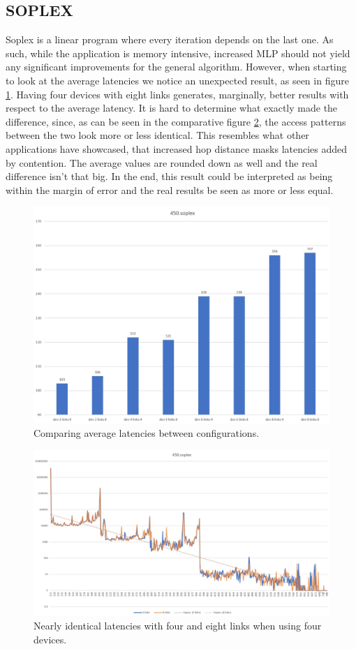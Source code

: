 \subsection{SOPLEX}
Soplex is a linear program where every iteration depends on the last one. As such, while the application is memory intensive, increased MLP should not yield any significant improvements for the general algorithm. However, when starting to look at the average latencies we notice an unexpected result, as seen in figure \ref{Memory-access-450-average-latency}. Having four devices with eight links generates, marginally, better results with respect to the average latency. It is hard to determine what exactly made the difference, since, as can be seen in the comparative figure \ref{Memory-access-450-4-dev-4-8-links}, the access patterns between the two look more or less identical. This resembles what other applications have showcased, that increased hop distance masks latencies added by contention. The average values are rounded down as well and the real difference isn't that big. In the end, this result could be interpreted as being within the margin of error and the real results be seen as more or less equal.

\begin{figure}[!ht]
    \centering
    \includegraphics[width=0.75\linewidth]{figure/450-averages.jpg}
    \caption{Comparing average latencies between configurations.}
    \label{Memory-access-450-average-latency}
\end{figure}

\begin{figure}[!ht]
    \centering
    \includegraphics[width=0.75\linewidth]{figure/450-4_4-8.jpg}
    \caption{Nearly identical latencies with four and eight links when using four devices.}
    \label{Memory-access-450-4-dev-4-8-links}
\end{figure}

